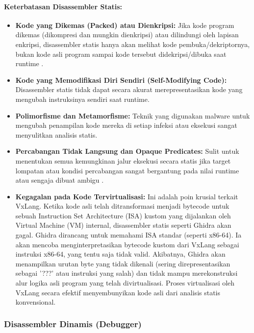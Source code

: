 \paragraph{Keterbatasan Disassembler Statis:}
\begin{itemize}
\item \textbf{Kode yang Dikemas (Packed) atau Dienkripsi:} Jika kode program dikemas (dikompresi dan mungkin dienkripsi) atau dilindungi oleh lapisan enkripsi, disassembler statis hanya akan melihat kode pembuka/dekriptornya, bukan kode asli program sampai kode tersebut didekripsi/dibuka saat runtime \cite{Sikorski2012}.
\item \textbf{Kode yang Memodifikasi Diri Sendiri (Self-Modifying Code):} Disassembler statis tidak dapat secara akurat merepresentasikan kode yang mengubah instruksinya sendiri saat runtime.
\item \textbf{Polimorfisme dan Metamorfisme:} Teknik yang digunakan malware untuk mengubah penampilan kode mereka di setiap infeksi atau eksekusi sangat menyulitkan analisis statis.
\item \textbf{Percabangan Tidak Langsung dan Opaque Predicates:} Sulit untuk menentukan semua kemungkinan jalur eksekusi secara statis jika target lompatan atau kondisi percabangan sangat bergantung pada nilai runtime atau sengaja dibuat ambigu \cite{Eilam2011}.
\item \textbf{Kegagalan pada Kode Tervirtualisasi:} Ini adalah poin krusial terkait VxLang. Ketika kode asli telah ditransformasi menjadi bytecode untuk sebuah Instruction Set Architecture (ISA) kustom yang dijalankan oleh Virtual Machine (VM) internal, disassembler statis seperti Ghidra akan gagal. Ghidra dirancang untuk memahami ISA standar (seperti x86-64). Ia akan mencoba menginterpretasikan bytecode kustom dari VxLang sebagai instruksi x86-64, yang tentu saja tidak valid. Akibatnya, Ghidra akan menampilkan urutan byte yang tidak dikenali (sering direpresentasikan sebagai '???' atau instruksi yang salah) dan tidak mampu merekonstruksi alur logika asli program yang telah divirtualisasi. Proses virtualisasi oleh VxLang secara efektif menyembunyikan kode asli dari analisis statis konvensional.
\end{itemize}

\label{subsec:disassembler_dinamis}
\subsubsection{Disassembler Dinamis (Debugger)}


